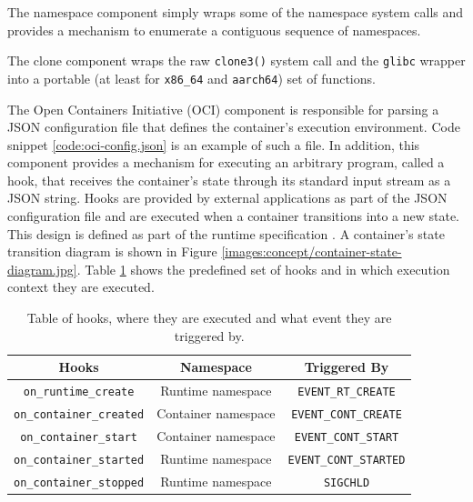 The namespace component simply wraps some of the namespace system calls and provides a 
mechanism to enumerate a contiguous sequence of namespaces.

The clone component wraps the raw \verb|clone3()| system call and the \verb|glibc| wrapper 
into a portable (at least for \verb|x86_64| and \verb|aarch64|) set of functions.

The Open Containers Initiative (OCI) component is responsible for parsing a JSON configuration 
file that defines the container's execution environment. Code snippet \ref{code:oci-config.json} 
is an example of such a file. In addition, this component provides a mechanism for executing an 
arbitrary program, called a hook, that receives the container's state through its standard input stream as a JSON string.
Hooks are provided by external applications as part of the JSON configuration file and are executed
when a container transitions into a new state.  This design is defined as part of the runtime specification \cite{oci-runtime-lifecycle}. 
A container's state transition diagram is shown in Figure \ref{images:concept/container-state-diagram.jpg}.
Table \ref{table:concept/runtime/hooks} shows the predefined set of hooks and in which execution 
context they are executed.

\begin{table}[h!]
    \centering
    \begin{tabular}{ |c|c|c| }
        \hline
        Hooks & Namespace & Triggered By \\
        \hline
        \verb|on_runtime_create| & Runtime namespace & \verb|EVENT_RT_CREATE| \\ %
        \hline 
        \verb|on_container_created| & Container namespace & \verb|EVENT_CONT_CREATE| \\ %
        \hline
        \verb|on_container_start| & Container namespace & \verb|EVENT_CONT_START| \\ %
        \hline
        \verb|on_container_started| & Runtime namespace & \verb|EVENT_CONT_STARTED| \\ %
        \hline
        \verb|on_container_stopped| & Runtime namespace & \verb|SIGCHLD| \\ %
        \hline
    \end{tabular}
    \caption{Table of hooks, where they are executed and what event they are triggered by.}
    \label{table:concept/runtime/hooks}
\end{table}

